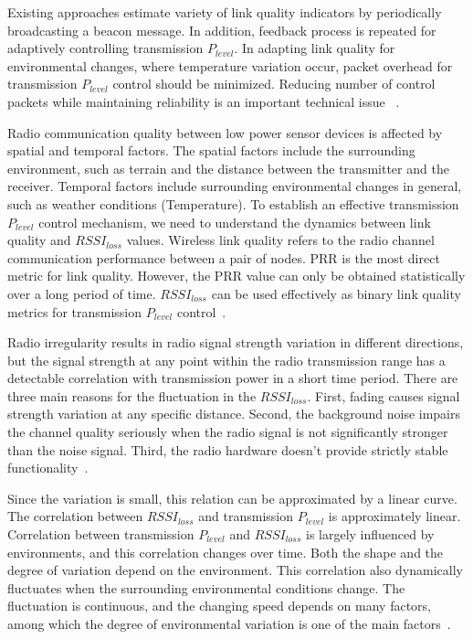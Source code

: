 \documentclass[12pt, conference, compsocconf, onecolumn, draftcls]{IEEEtran}
\begin{document}
Existing approaches estimate variety of link quality indicators by periodically broadcasting a beacon message. In addition, feedback process is repeated for adaptively controlling transmission $P_{level}$. In adapting link quality for environmental changes, where temperature variation occur, packet overhead for transmission $P_{level}$ control should be minimized. Reducing number of control packets while maintaining reliability is an important technical issue ~\cite{8}.

Radio communication quality between low power sensor devices is affected by spatial and temporal factors. The spatial factors include the surrounding environment, such as terrain and the distance between the transmitter and the receiver. Temporal factors include surrounding environmental changes in general, such as weather conditions (Temperature). To establish an effective transmission $P_{level}$ control mechanism, we need to understand the dynamics between link quality and $RSSI_{loss}$ values. Wireless link quality refers to the radio channel communication performance between a pair of nodes. PRR is the most direct metric for link quality. However, the PRR value can only be obtained statistically over a long period of time. $RSSI_{loss}$ can be used effectively as binary link quality metrics for transmission $P_{level}$ control~\cite{9}.

Radio irregularity results in radio signal strength variation in different directions, but the signal strength at any point within the radio transmission range has a detectable correlation with transmission power in a short time period.  There are three main reasons for the fluctuation in the $RSSI_{loss}$. First, fading causes signal strength variation at any specific distance. Second, the background noise impairs the channel quality seriously when the radio signal is not significantly stronger than the noise signal. Third, the radio hardware doesn’t provide strictly stable functionality~\cite{10}.

Since the variation is small, this relation can be approximated by a linear curve. The correlation between $RSSI_{loss}$ and transmission $P_{level}$ is approximately linear.  Correlation between transmission $P_{level}$ and $RSSI_{loss}$ is largely influenced by environments, and this correlation changes over time. Both the shape and the degree of variation depend on the environment. This correlation also dynamically fluctuates when the surrounding environmental conditions change. The fluctuation is continuous, and the changing speed depends on many factors, among which the degree of environmental variation is one of the main factors~\cite{11}.
\end{document}
